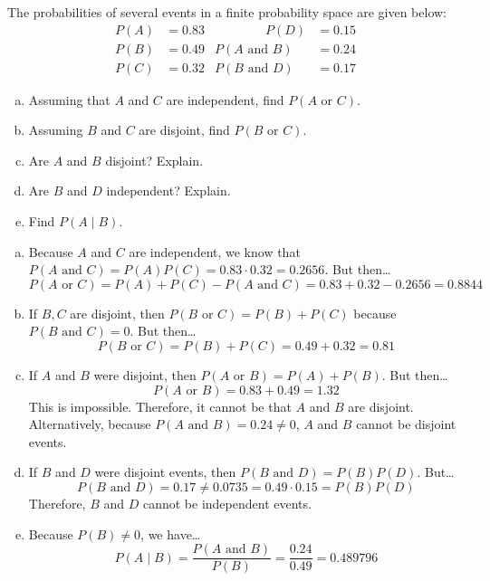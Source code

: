 \documentclass[11pt,letterpaper]{article}
\begin{document}
\newpage



 The probabilities of several events in a finite probability space are given below:
	\[
	\begin{aligned}
	P(A)&= 0.83 &\qquad\qquad P(D)&= 0.15 \\
	P(B)&= 0.49 & P(A \text{ and } B)&= 0.24 \\
	P(C)&= 0.32 & P(B \text{ and } D)&= 0.17 
	\end{aligned}
	\] 

\begin{enumerate}[(a)]
\item Assuming that $A$ and $C$ are independent, find $P(A \text{ or } C)$.
\item Assuming $B$ and $C$ are disjoint, find $P(B \text{ or } C)$.
\item Are $A$ and $B$ disjoint? Explain.
\item Are $B$ and $D$ independent? Explain. 
\item Find $P(A \;|\; B)$.
\end{enumerate} \pspace

\sol
\begin{enumerate}[(a)]
\item Because $A$ and $C$ are independent, we know that $P(A \text{ and } C)= P(A) P(C)= 0.83 \cdot 0.32= 0.2656$. But then\dots
	\[
	P(A \text{ or } C)= P(A) + P(C) - P(A \text{ and } C)= 0.83 + 0.32 - 0.2656= 0.8844
	\] \pspace

\item If $B, C$ are disjoint, then $P(B \text{ or } C)= P(B) + P(C)$ because $P(B \text{ and } C)= 0$. But then\dots
	\[
	P(B \text{ or } C)= P(B) + P(C)= 0.49 + 0.32= 0.81
	\] \pspace

\item If $A$ and $B$ were disjoint, then $P(A \text{ or } B)= P(A) + P(B)$. But then\dots
	\[
	P(A \text{ or } B)= 0.83 + 0.49= 1.32
	\]
This is impossible. Therefore, it cannot be that $A$ and $B$ are disjoint. Alternatively, because $P(A \text{ and } B)= 0.24 \neq 0$, $A$ and $B$ cannot be disjoint events. \pspace 

\item If $B$ and $D$ were disjoint events, then $P(B \text{ and } D)= P(B) P(D)$. But\dots
	\[
	P(B \text{ and } D)= 0.17 \neq 0.0735= 0.49 \cdot 0.15= P(B) P(D)
	\] 
Therefore, $B$ and $D$ cannot be independent events. \pspace

\item Because $P(B) \neq 0$, we have\dots
	\[
	P(A \;|\; B)= \dfrac{P(A \text{ and } B)}{P(B)}= \dfrac{0.24}{0.49}= 0.489796
	\]
\end{enumerate}
\end{document}
